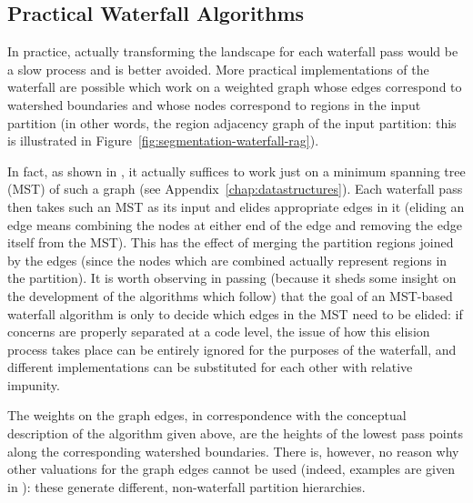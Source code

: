 \subsection{Practical Waterfall Algorithms}

In practice, actually transforming the landscape for each waterfall pass would be a slow process and is better avoided. More practical implementations of the waterfall are possible which work on a weighted graph whose edges correspond to watershed boundaries and whose nodes correspond to regions in the input partition (in other words, the region adjacency graph of the input partition: this is illustrated in Figure~\ref{fig:segmentation-waterfall-rag}).


In fact, as shown in \cite{marcotegui05}, it actually suffices to work just on a minimum spanning tree (MST) of such a graph (see Appendix~\ref{chap:datastructures}). Each waterfall pass then takes such an MST as its input and elides appropriate edges in it (eliding an edge means combining the nodes at either end of the edge and removing the edge itself from the MST). This has the effect of merging the partition regions joined by the edges (since the nodes which are combined actually represent regions in the partition). It is worth observing in passing (because it sheds some insight on the development of the algorithms which follow) that the goal of an MST-based waterfall algorithm is only to decide which edges in the MST need to be elided: if concerns are properly separated at a code level, the issue of how this elision process takes place can be entirely ignored for the purposes of the waterfall, and different implementations can be substituted for each other with relative impunity.

The weights on the graph edges, in correspondence with the conceptual description of the algorithm given above, are the heights of the lowest pass points along the corresponding watershed boundaries. There is, however, no reason why other valuations for the graph edges cannot be used (indeed, examples are given in \cite{marcotegui05}): these generate different, non-waterfall partition hierarchies.

